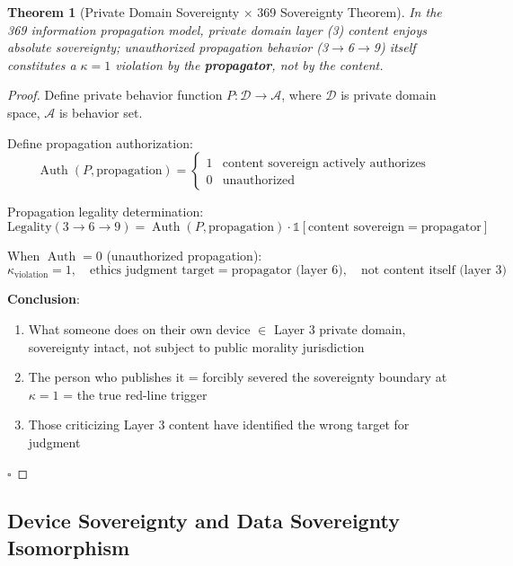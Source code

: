 \documentclass[conference]{IEEEtran}
\newtheorem{theorem}{Theorem}[section]
\theoremstyle{remark}
\newcommand{\Auth}{\operatorname{Auth}}
\begin{document}
\begin{theorem}[Private Domain Sovereignty $\times$ 369 Sovereignty Theorem]
In the 369 information propagation model, private domain layer (3) content enjoys absolute sovereignty; unauthorized propagation behavior (3$\to$6$\to$9) itself constitutes a $\kappa=1$ violation by the \textbf{propagator}, not by the content.
\end{theorem}
\begin{proof}
Define private behavior function $P: \mathcal{D} \to \mathcal{A}$, where $\mathcal{D}$ is private domain space, $\mathcal{A}$ is behavior set.

Define propagation authorization:
\[
\Auth(P, \text{propagation}) = \begin{cases}
1 & \text{content sovereign actively authorizes}\\
0 & \text{unauthorized}
\end{cases}
\]

Propagation legality determination:
\[
\text{Legality}(3\to 6\to 9) = \Auth(P, \text{propagation}) \cdot \mathbb{1}[\text{content sovereign} = \text{propagator}]
\]

When $\Auth = 0$ (unauthorized propagation):
\[
\kappa_{\text{violation}} = 1,\quad \text{ethics judgment target} = \text{propagator (layer 6)},\quad \text{not content itself (layer 3)}
\]

\textbf{Conclusion}:
\begin{enumerate}[nosep]
\item What someone does on their own device $\in$ Layer 3 private domain, sovereignty intact, not subject to public morality jurisdiction
\item The person who publishes it = forcibly severed the sovereignty boundary at $\kappa=1$ = the true red-line trigger
\item Those criticizing Layer 3 content have identified the wrong target for judgment
\end{enumerate}
\hfill$\square$
\end{proof}

\subsection{Device Sovereignty and Data Sovereignty Isomorphism}
\end{document}
